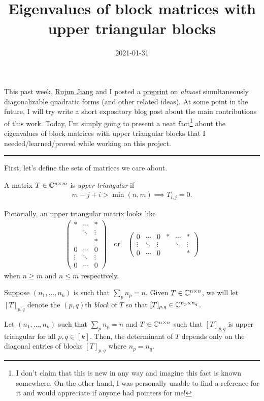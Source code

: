\documentclass{article}
\title{Eigenvalues of block matrices with upper triangular blocks}
\date{2021-01-31}
\begin{document}
This past week, \href{https://rjjiang.github.io/}{Rujun Jiang} and I posted a \href{https://arxiv.org/abs/2101.12141}{preprint} on \textit{almost} simultaneously diagonalizable quadratic forms (and other related ideas). At some point in the future, I will try write a short expository blog post about the main contributions of this work.
Today, I'm simply going to present a neat fact\footnote{I don't claim that this is new in any way and imagine this fact is known somewhere. On the other hand, I was personally unable to find a reference for it and would appreciate if anyone had pointers for me!} about the eigenvalues of block matrices with upper triangular blocks that I needed/learned/proved while working on this project.

\rule{0.5\linewidth}{\linethickness}

First, let's define the sets of matrices we care about.

\begin{definition}
A matrix $T\in{\mathbb{C}}^{n \times m}$ is \textit{upper triangular} if
\begin{align*}
m -j + i > \min(n,m) \implies T_{i,j} = 0.
\end{align*}
\end{definition}
Pictorially, an upper triangular matrix looks like
\begin{align*}
\begin{pmatrix}
	* & \cdots & *\\
	 & \ddots & \vdots\\
	 &  & *\\
	0 & \cdots & 0\\
	\vdots & \ddots & \vdots\\
	0 & \cdots & 0
\end{pmatrix}\quad\text{or}\quad
\begin{pmatrix}
	0 & \cdots & 0 & * & \cdots & *\\
	\vdots & \ddots & \vdots & & \ddots & \vdots\\
	0 & \cdots & 0 & &  & *
\end{pmatrix}
\end{align*}
when $n\geq m$ and $n\leq m$ respectively.

Suppose $(n_1,\dots,n_k)$ is such that $\sum_p n_p = n$. Given $T\in{\mathbb{C}}^{n\times n}$, we will let $[T]_{p,q}$ denote the $(p,q)$th \textit{block} of $T$ so that $[T]_{p,q} \in{\mathbb{C}}^{n_p\times n_q}$.

\begin{proposition}
Let $(n_1,\dots,n_k)$ such that $\sum_p n_p = n$ and $T\in{\mathbb{C}}^{n\times n}$ such that $[T]_{p,q}$ is upper triangular for all $p,q\in[k]$. Then, the determinant of $T$ depends only on the diagonal entries of blocks $[T]_{p,q}$ where $n_p = n_q$.
\end{proposition}
\end{document}
